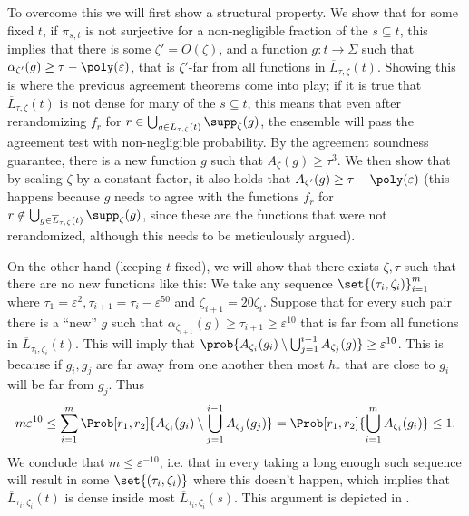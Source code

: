 To overcome this we will first show a structural property. We show that for some fixed \(t\), if \(\pi_{s,t}\) is not surjective for a non-negligible fraction of the \(s \subseteq t\), this implies that there is some \(\zeta' = O(\zeta)\), and a function \(g:t \to \Sigma\) such that \(\alpha_{\zeta'}(g) \geq \tau - \poly(\varepsilon)\), that is \(\zeta'\)-far from all functions in \(\overline{L}_{\tau,\zeta}(t)\). Showing this is where the previous agreement theorems come into play; if it is true that \(\overline{L}_{\tau,\zeta}(t)\) is not dense for many of the \(s \subseteq t\), this means that even after rerandomizing \(f_r\) for \(r \in \bigcup_{g \in \overline{L}_{\tau,\zeta}(t)} \supp_{\zeta}(g)\), the ensemble will pass the agreement test with non-negligible probability. By the agreement soundness guarantee, there is a new function \(g\) such that \(A_\zeta (g) \geq \tau^3\). We then show that by scaling \(\zeta\) by a constant factor, it also holds that \(A_{\zeta'} (g) \geq \tau-\poly(\varepsilon)\) (this happens because \(g\) needs to agree with the functions \(f_r\) for \(r \notin \bigcup_{g \in \overline{L}_{\tau,\zeta}(t)} \supp_{\zeta}(g)\), since these are the functions that were not rerandomized, although this needs to be meticulously argued).

On the other hand (keeping \(t\) fixed), we will show that there exists \(\zeta, \tau\) such that there are no new functions like this: We take any sequence \(\set{(\tau_i,\zeta_i)}_{i=1}^m\) where \(\tau_1=\varepsilon^2, \tau_{i+1}= \tau_i - \varepsilon^{50}\) and \(\zeta_{i+1} = 20\zeta_i\). Suppose that for every such pair there is a ``new'' \(g\) such that \(\alpha_{\zeta_{i+1}}(g) \geq \tau_{i+1} \geq \varepsilon^{10}\) that is far from all functions in \(\overline{L}_{\tau_i,\zeta_i}(t)\). This will imply that \(\prob{A_{\zeta_i}(g_i) \setminus \bigcup_{j=1}^{i-1} A_{\zeta_j}(g)} \geq \varepsilon^{10}\). This is because if \(g_i,g_{j}\) are far away from one another then most \(h_r\) that are close to \(g_i\) will be far from \(g_{j}\). Thus 
\[m\varepsilon^{10}\leq \sum_{i=1}^m \Prob[r_1,r_2]{A_{\zeta_i}(g_i) \setminus \bigcup_{j=1}^{i-1} A_{\zeta_j}(g_j)} = \Prob[r_1,r_2]{\bigcup_{i=1}^m A_{\zeta_i}(g_i)} \leq 1.\] 
We conclude that \(m \leq \varepsilon^{-10}\), i.e. that in every taking a long enough such sequence will result in some \(\set{(\tau_i,\zeta_i)}\) where this doesn't happen, which implies that \(\overline{L}_{\tau_i,\zeta_i}(t)\) is dense inside most \(\overline{L}_{\tau_i,\zeta_i}(s)\). This argument is depicted in .

